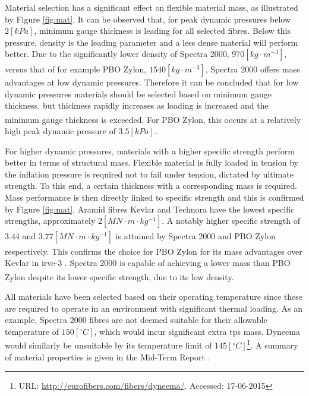 Material selection has a significant effect on flexible material mass, as illustrated by Figure \ref{fig:mat}. It can be observed that, for peak dynamic pressures below $2 \left[kPa\right]$, minimum gauge thickness is leading for all selected fibres. Below this pressure, density is the leading parameter and a less dense material will perform better. Due to the significantly lower density of Spectra 2000, $970 \left[kg \cdot m^{-3}\right]$, versus that of for example PBO Zylon\textsuperscript{\textregistered}, $1540 \left[kg \cdot m^{-3}\right]$, Spectra 2000 offers mass advantages at low dynamic pressures. Therefore it can be concluded that for low dynamic pressures materials should be selected based on minimum gauge thickness, but thickness rapidly increases as loading is increased and the minimum gauge thickness is exceeded. For PBO Zylon\textsuperscript{\textregistered}, this occurs at a relatively high peak dynamic pressure of $3.5 \left[kPa\right]$.

For higher dynamic pressures, materials with a higher specific strength perform better in terms of structural mass. Flexible material is fully loaded in tension by the inflation pressure is required not to fail under tension, dictated by ultimate strength. To this end, a certain thickness with a corresponding mass is required. Mass performance is then directly linked to specific strength and this is confirmed by Figure \ref{fig:mat}. Aramid fibres Kevlar and Technora have the lowest specific strengths, approximately $2 \left[MN\cdot m \cdot kg^{-1}\right]$. A notably higher specific strength of $3.44$ and $3.77 \left[MN\cdot m \cdot kg^{-1}\right]$ is attained by Spectra 2000 and PBO Zylon\textsuperscript{\textregistered} respectively. This confirms the choice for PBO Zylon\textsuperscript{\textregistered} for its mass advantages over Kevlar in \gls{irve}-3 \cite{Dillman2012a}. Spectra 2000 is capable of achieving a lower mass than PBO Zylon\textsuperscript{\textregistered} despite its lower specific strength, due to its low density. 

All materials have been selected based on their operating temperature since these are required to operate in an environment with significant thermal loading. As an example, Spectra 2000 fibres are not deemed suitable for their allowable temperature of $150 \left[^{\circ}C\right]$, which would incur significant extra \gls{tps} mass. Dyneema would similarly be unsuitable by its temperature limit of $145 \left[^{\circ}C\right]$\footnote{URL: \url{http://eurofibers.com/fibers/dyneema/}. Accessed: 17-06-2015}. A summary of material properties is given in the Mid-Term Report \cite[p.64]{Balasooriyan2015b}. 

